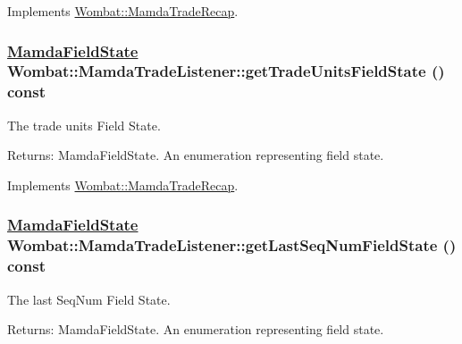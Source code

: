 Implements \hyperlink{classWombat_1_1MamdaTradeRecap_45483e8e818629de79c926ed89feaa9d}{Wombat::Mamda\-Trade\-Recap}.\hypertarget{classWombat_1_1MamdaTradeListener_9c8d5e8e3f9aca07499877ea4b27c765}{
\subsubsection[getTradeUnitsFieldState]{\setlength{\rightskip}{0pt plus 5cm}\hyperlink{namespaceWombat_93aac974f2ab713554fd12a1fa3b7d2a}{Mamda\-Field\-State} Wombat::Mamda\-Trade\-Listener::get\-Trade\-Units\-Field\-State () const}}
\label{classWombat_1_1MamdaTradeListener_9c8d5e8e3f9aca07499877ea4b27c765}


The trade units Field State. 

\begin{Desc}
\item[Returns:]Mamda\-Field\-State. An enumeration representing field state. \end{Desc}


Implements \hyperlink{classWombat_1_1MamdaTradeRecap_76b2a0d55943b5bae38766f11bcc400e}{Wombat::Mamda\-Trade\-Recap}.\hypertarget{classWombat_1_1MamdaTradeListener_3bd3e58f99dcb1456e393d3c204a8ce9}{
\subsubsection[getLastSeqNumFieldState]{\setlength{\rightskip}{0pt plus 5cm}\hyperlink{namespaceWombat_93aac974f2ab713554fd12a1fa3b7d2a}{Mamda\-Field\-State} Wombat::Mamda\-Trade\-Listener::get\-Last\-Seq\-Num\-Field\-State () const}}
\label{classWombat_1_1MamdaTradeListener_3bd3e58f99dcb1456e393d3c204a8ce9}


The last Seq\-Num Field State. 

\begin{Desc}
\item[Returns:]Mamda\-Field\-State. An enumeration representing field state. \end{Desc}


